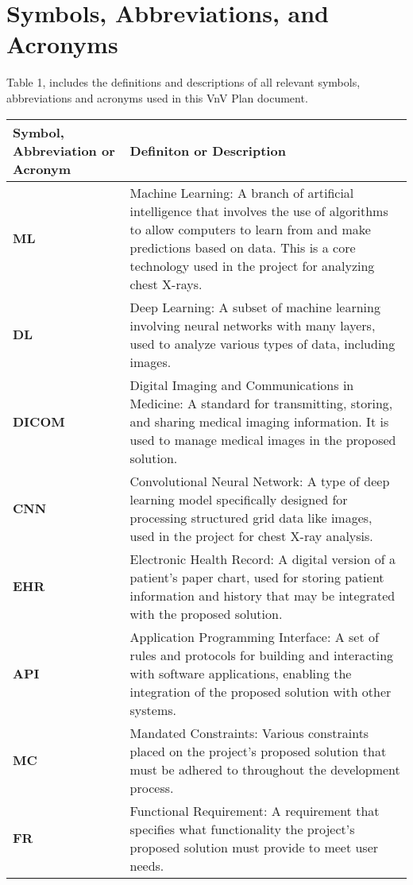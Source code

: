 \documentclass[12pt, titlepage]{article}
\begin{document}
\listoftables

\newpage

\section{Symbols, Abbreviations, and Acronyms}

Table 1, includes the definitions and descriptions of all relevant symbols,
abbreviations and acronyms used in this VnV Plan document.

\begin{longtable}[c]{|p{}|p{}|}
  \hline
  \textbf{Symbol, Abbreviation or Acronym} & \textbf{Definiton or Description} \\ \hline
  \textbf{ML} & Machine Learning: A branch of artificial intelligence that involves the use of algorithms to allow computers to learn from and make predictions based on data. This is a core technology used in the project for analyzing chest X-rays. \\ \hline
  \textbf{DL} & Deep Learning: A subset of machine learning involving neural networks with many layers, used to analyze various types of data, including images. \\ \hline
  \textbf{DICOM} & Digital Imaging and Communications in Medicine: A standard for transmitting, storing, and sharing medical imaging information. It is used to manage medical images in the proposed solution. \\ \hline
  \textbf{CNN} & Convolutional Neural Network: A type of deep learning model specifically designed for processing structured grid data like images, used in the project for chest X-ray analysis. \\ \hline
  \textbf{EHR} & Electronic Health Record: A digital version of a patient's paper chart, used for storing patient information and history that may be integrated with the proposed solution. \\ \hline
  \textbf{API} & Application Programming Interface: A set of rules and protocols for building and interacting with software applications, enabling the integration of the proposed solution with other systems. \\ \hline
  \textbf{MC} & Mandated Constraints: Various constraints placed on the project's proposed solution that must be adhered to throughout the development process. \\ \hline
  \textbf{FR} & Functional Requirement: A requirement that specifies what functionality the project's proposed solution must provide to meet user needs. \\ \hline

\end{longtable}
\end{document}
